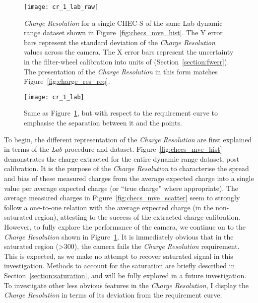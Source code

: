 \begin{figure}
	\centering
    \texttt{[image: cr\_1\_lab\_raw]} 
	\caption[\textit{Charge Resolution} of the Lab dataset in default units.]{\textit{Charge Resolution} for a single CHEC-S of the same Lab dynamic range dataset shown in Figure~\ref{fig:checs_mve_hist}. The Y error bars represent the standard deviation of the \textit{Charge Resolution} values across the camera. The X error bars represent the uncertainty in the filter-wheel calibration into units of \si{\pe} (Section~\ref{section:fwerr}). The presentation of the \textit{Charge Resolution} in this form matches Figure~\ref{fig:charge_res_req}.}
	\label{fig:cr_1_lab_raw}
\end{figure}

\begin{figure}
	\centering
    \texttt{[image: cr\_1\_lab]} 
	\caption[\textit{Charge Resolution} of the Lab dataset with respect to the requirement.]{Same as Figure~\ref{fig:cr_1_lab_raw}, but with respect to the requirement curve to emphasise the separation between it and the points.}
	\label{fig:cr_1_lab}
\end{figure}

To begin, the different representation of the \textit{Charge Resolution} are first explained in terms of the \textit{Lab} procedure and dataset. Figure~\ref{fig:checs_mve_hist} demonstrates the charge extracted for the entire dynamic range dataset, post calibration. It is the purpose of the \textit{Charge Resolution} to characterise the spread and bias of these measured charges from the average expected charge into a single value per average expected charge (or ``true charge'' where appropriate). The average measured charges in Figure~\ref{fig:checs_mve_scatter} seem to strongly follow a one-to-one relation with the average expected charge (in the non-saturated region), attesting to the success of the extracted charge calibration. However, to fully explore the performance of the camera, we continue on to the \textit{Charge Resolution} shown in Figure~\ref{fig:cr_1_lab_raw}. It is immediately obvious that in the saturated region (\SI{>300}{\pe}), the camera fails the \textit{Charge Resolution} requirement. This is expected, as we make no attempt to recover saturated signal in this investigation. Methods to account for the saturation are briefly described in Section~\ref{section:saturation}, and will be fully explored in a future investigation. To investigate other less obvious features in the \textit{Charge Resolution}, I display the \textit{Charge Resolution} in terms of its deviation from the requirement curve.

